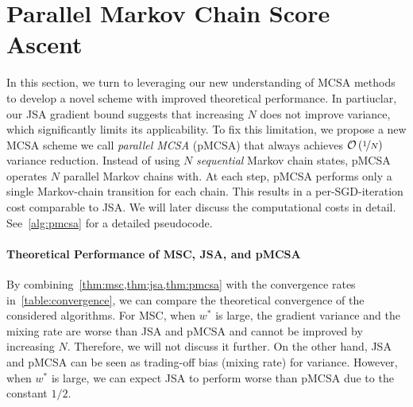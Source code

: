 \section{Parallel Markov Chain Score Ascent}
In this section, we turn to leveraging our new understanding of MCSA methods to develop a novel scheme with improved theoretical performance.  In partiuclar, our JSA gradient bound suggests that increasing \(N\) does not improve variance, which significantly limits its applicability.
To fix this limitation, we propose a new MCSA scheme we call \textit{parallel MCSA} (pMCSA) that always achieves \(\mathcal{O}\left(\nicefrac{1}{N}\right)\) variance reduction.
Instead of using \(N\) \textit{sequential} Markov chain states, pMCSA operates \(N\) parallel Markov chains with.
At each step, pMCSA performs only a single Markov-chain transition for each chain.
This results in a per-SGD-iteration cost comparable to JSA.
We will later discuss the computational costs in detail.
See~\cref{alg:pmcsa} for a detailed pseudocode.




\vspace{-0.1in}
\paragraph{Theoretical Performance of MSC, JSA, and pMCSA}
By combining~\cref{thm:msc,thm:jsa,thm:pmcsa} with the convergence rates in~\cref{table:convergence}, we can compare the theoretical convergence of the considered algorithms.
For MSC, when \(w^*\) is large, the gradient variance and the mixing rate are worse than JSA and pMCSA and cannot be improved by increasing \(N\).
Therefore, we will not discuss it further.
On the other hand, JSA and pMCSA can be seen as trading-off bias (mixing rate) for variance.
However, when \(w^*\) is large, we can expect JSA to perform worse than pMCSA due to the constant \(1/2\).

